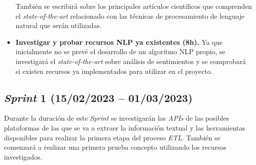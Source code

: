 \begin{itemize}
    También se escribirá sobre los principales artículos científicos que comprenden el \textit{state-of-the-art} relacionado con las técnicas de procesamiento de lenguaje natural que serán utilizadas.

    \item \textbf{Investigar y probar recursos NLP ya existentes (8h).} Ya que inicialmente no se prevé el desarrollo de un algoritmo NLP propio, se investigará el \textit{state-of-the-art} sobre análisis de sentimientos y se comprobará si existen recursos ya implementados para utilizar en el proyecto.

\end{itemize}


\subsection{\textit{Sprint} 1 (15/02/2023 -- 01/03/2023)}

Durante la duración de este \textit{Sprint} se investigarán las \textit{APIs} de las posibles plataformas de las que se va a extraer la información textual y las herramientas disponibles para realizar la primera etapa del proceso \textit{ETL}. También se comenzará a realizar una primera prueba concepto utilizando los recursos investigados.

